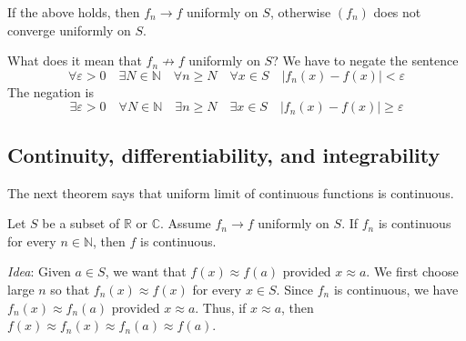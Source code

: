 \documentclass[a4paper,11pt]{article}
\begin{document}
If the above holds, then $f_{n} \rightarrow f$ uniformly on $S$, otherwise $\left(f_{n}\right)$ does not converge uniformly on $S$.

\begin{remark}
    What does it mean that $f_{n} \not \rightarrow f$ uniformly on $S$? We have to negate the sentence
    \[
    \forall \varepsilon>0 \quad \exists N \in \mathbb{N} \quad \forall n \geqslant N \quad \forall x \in S \quad\left|f_{n}(x)-f(x)\right|<\varepsilon
    \]
    The negation is
    \[
    \exists \varepsilon>0 \quad \forall N \in \mathbb{N} \quad \exists n \geqslant N \quad \exists x \in S \quad\left|f_{n}(x)-f(x)\right| \geqslant \varepsilon
    \]
\end{remark}

\subsection{Continuity, differentiability, and integrability}

The next theorem says that uniform limit of continuous functions is continuous.
\begin{theorem}\label{thm:1}
    Let $S$ be a subset of $\mathbb{R}$ or $\mathbb{C}$. Assume $f_{n} \rightarrow f$ uniformly on $S$. If $f_{n}$ is continuous for every $n \in \mathbb{N}$, then $f$ is continuous.
\end{theorem}
\textit{Idea}: Given $a \in S$, we want that $f(x) \approx f(a)$ provided $x \approx a$. We first choose large $n$ so that $f_{n}(x) \approx f(x)$ for every $x \in S$. Since $f_{n}$ is continuous, we have $f_{n}(x) \approx f_{n}(a)$ provided $x \approx a$. Thus, if $x \approx a$, then $f(x) \approx f_{n}(x) \approx f_{n}(a) \approx f(a)$.
\end{document}

